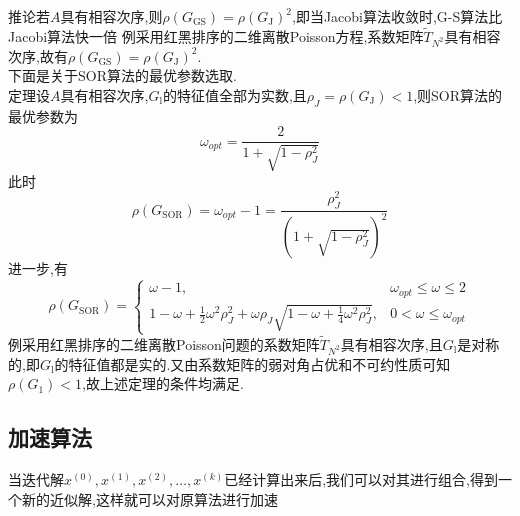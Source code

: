 \documentclass[12pt,a4paper]{article}
\begin{document}
{\color{blue}推论}\quad 若$A$具有相容次序,则$\rho\left(G_{\mathrm{GS}}\right)=\rho\left(G_{\mathrm{J}}\right)^{2}$,即当Jacobi算法收敛时,G-S算法比Jacobi算法快一倍
{\color{blue}例}\qquad 采用红黑排序的二维离散Poisson方程,系数矩阵$\tilde{T}_{N^{2}}$具有相容次序,故有$\rho\left(G_{\mathrm{GS}}\right)=\rho\left(G_{\mathrm{J}}\right)^{2}$.\\
下面是关于SOR算法的最优参数选取.\\
{\color{blue}定理}\qquad 设$A$具有相容次序,$G_{\mathrm{l}}$的特征值全部为实数,且$\rho_{J}=\rho\left(G_{\mathrm{J}}\right)<1$,则SOR算法的最优参数为
$$
\omega_{o p t}=\frac{2}{1+\sqrt{1-\rho_{J}^{2}}}
$$
此时
$$
\rho\left(G_{\mathrm{SOR}}\right)=\omega_{o p t}-1=\frac{\rho_{J}^{2}}{\left(1+\sqrt{1-\rho_{J}^{2}}\right)^{2}}
$$
进一步,有
$$
\rho\left(G_{\mathrm{SOR}}\right)=\left\{\begin{array}{ll}{\omega-1,} & {\omega_{o p t} \leq \omega \leq 2} \\ {1-\omega+\frac{1}{2} \omega^{2} \rho_{J}^{2}+\omega \rho_{J} \sqrt{1-\omega+\frac{1}{4} \omega^{2} \rho_{J}^{2}},} & {0<\omega \leq \omega_{o p t}}\end{array}\right.
$$
{\color{blue}例}\qquad 采用红黑排序的二维离散Poisson问题的系数矩阵$\tilde{T}_{N^{2}}$具有相容次序,且$G_{\mathrm{l}}$是对称的,即$G_{\mathrm{l}}$的特征值都是实的.又由系数矩阵的弱对角占优和不可约性质可知$\rho\left(G_{1}\right)<1$,故上述定理的条件均满足.
\subsection{加速算法}
当迭代解$x^{(0)}, x^{(1)}, x^{(2)}, \ldots, x^{(k)}$已经计算出来后,我们可以对其进行组合,得到一个新的近似解,这样就可以对原算法进行加速
\end{document}
